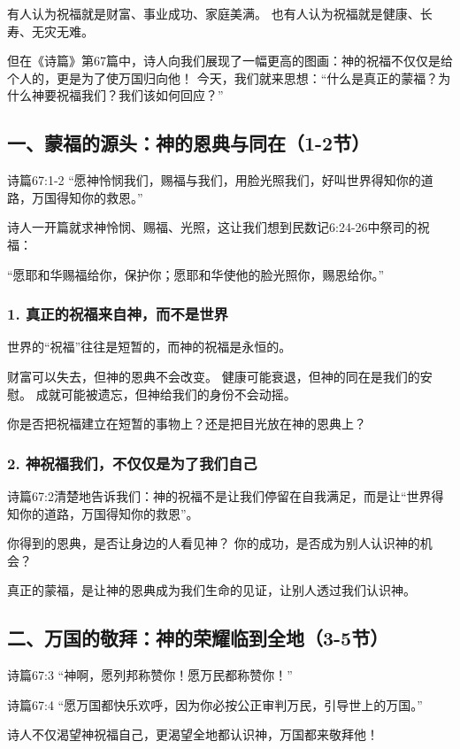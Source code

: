 \documentclass[a4paper, 12pt]{article}
\begin{document}
有人认为祝福就是财富、事业成功、家庭美满。
也有人认为祝福就是健康、长寿、无灾无难。

但在《诗篇》第67篇中，诗人向我们展现了一幅更高的图画：神的祝福不仅仅是给个人的，更是为了使万国归向他！
今天，我们就来思想：“什么是真正的蒙福？为什么神要祝福我们？我们该如何回应？”

\subsection*{一、蒙福的源头：神的恩典与同在（1-2节）}
诗篇67:1-2 “愿神怜悯我们，赐福与我们，用脸光照我们，好叫世界得知你的道路，万国得知你的救恩。”

诗人一开篇就求神怜悯、赐福、光照，这让我们想到民数记6:24-26中祭司的祝福：

“愿耶和华赐福给你，保护你；愿耶和华使他的脸光照你，赐恩给你。”
\subsubsection*{1. 真正的祝福来自神，而不是世界}
\hspace{0.6cm}世界的“祝福”往往是短暂的，而神的祝福是永恒的。

财富可以失去，但神的恩典不会改变。
健康可能衰退，但神的同在是我们的安慰。
成就可能被遗忘，但神给我们的身份不会动摇。

你是否把祝福建立在短暂的事物上？还是把目光放在神的恩典上？
\subsubsection*{2. 神祝福我们，不仅仅是为了我们自己}
\hspace{0.6cm}诗篇67:2清楚地告诉我们：神的祝福不是让我们停留在自我满足，而是让“世界得知你的道路，万国得知你的救恩”。

你得到的恩典，是否让身边的人看见神？
你的成功，是否成为别人认识神的机会？

真正的蒙福，是让神的恩典成为我们生命的见证，让别人透过我们认识神。

\subsection*{二、万国的敬拜：神的荣耀临到全地（3-5节）}
\hspace{0.6cm}诗篇67:3 “神啊，愿列邦称赞你！愿万民都称赞你！”

诗篇67:4 “愿万国都快乐欢呼，因为你必按公正审判万民，引导世上的万国。”

诗人不仅渴望神祝福自己，更渴望全地都认识神，万国都来敬拜他！
\end{document}
